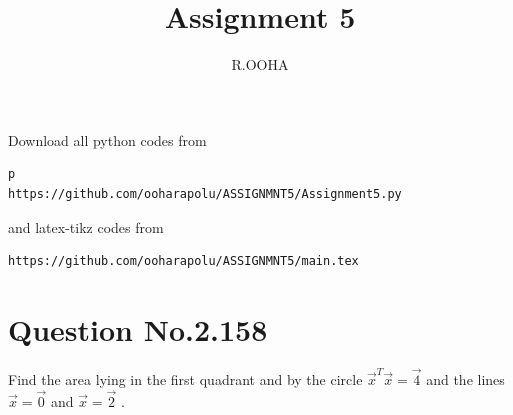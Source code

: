 \documentclass[journal,12pt,twocolumn]{IEEEtran}
\begin{document}
     \def\rightbox#1{\makebox[0in][r]{#1}}
     \def\centbox#1{\makebox[0in]{#1}}
     \def\topbox#1{\raisebox{-\baselineskip}[0in][0in]{#1}}
     \def\midbox#1{\raisebox{-0.5\baselineskip}[0in][0in]{#1}}
\vspace{3cm}
\title{Assignment 5}
\author{R.OOHA}
\maketitle
\newpage
\bigskip
\renewcommand{\thefigure}{\theenumi}
\renewcommand{\thetable}{\theenumi}
Download all python codes from 
\begin{lstlisting}p
https://github.com/ooharapolu/ASSIGNMNT5/Assignment5.py
\end{lstlisting}
%
and latex-tikz codes from 
%
\begin{lstlisting}
https://github.com/ooharapolu/ASSIGNMNT5/main.tex
\end{lstlisting}
%
\section{Question No.2.158}
Find the area lying in the first quadrant and by the circle $\vec{x}^T\vec{x}=\vec{4}$ and the lines $\vec{x}=\vec{0}$ and $\vec{x}=\vec{2}$ .
%
\end{document}
